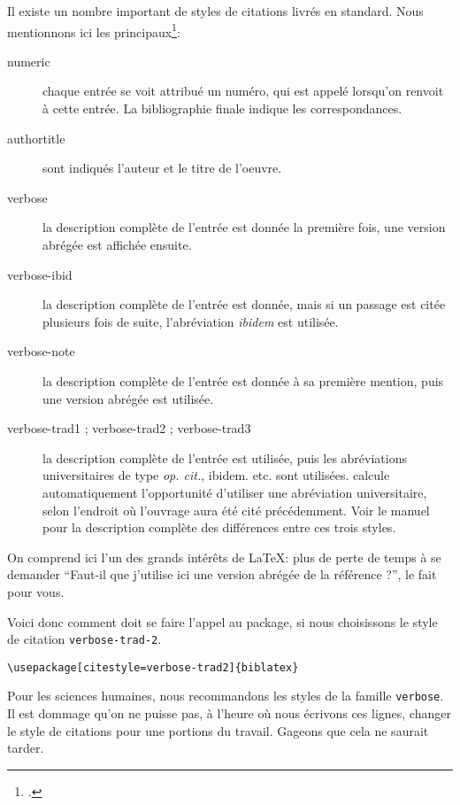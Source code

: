 Il existe un nombre important de styles de citations livrés en standard. Nous mentionnons ici les principaux\footcite[Se reporter pour plus de détails à][]{biblatex_style}:
\begin{description}
\item[numeric]chaque entrée se voit attribué un numéro, qui est appelé lorsqu'on renvoit à cette entrée. La bibliographie finale indique les correspondances.
\item[authortitle]sont indiqués l'auteur et le titre de l'oeuvre.
\item[verbose]la description complète de l'entrée est donnée la première fois, une version abrégée est affichée ensuite.
\item[verbose-ibid]la description complète de l'entrée est donnée, mais si un passage est citée plusieurs fois de suite, l'abréviation \emph{ibidem} est utilisée.
\item[verbose-note]la description complète de l'entrée est donnée à sa première mention, puis une version abrégée est utilisée.
\item[verbose-trad1 ; verbose-trad2 ; verbose-trad3]la description complète de l'entrée est utilisée, puis les abréviations universitaires de type \emph{op. cit.}, {ibidem.} etc. sont utilisées.  calcule automatiquement l'opportunité d'utiliser une abréviation universitaire, selon l'endroit où l'ouvrage aura été cité précédemment. Voir le manuel pour la description complète des différences entre ces trois styles.
\end{description}

On comprend ici l'un des grands intérêts de \LaTeX : plus de perte de temps à se demander \enquote{Faut-il que j'utilise ici une version abrégée de la référence ?},  le fait pour vous.

Voici donc comment doit se faire l'appel au package, si nous choisissons le style de citation \verb|verbose-trad-2|.

\begin{verbatim}
\usepackage[citestyle=verbose-trad2]{biblatex}
\end{verbatim}

Pour les sciences humaines, nous recommandons les styles de la famille \verb|verbose|.
Il est dommage qu'on ne puisse pas, à l'heure où nous écrivons ces lignes, changer le style de citations pour une portions du travail. Gageons que cela ne saurait tarder. 

